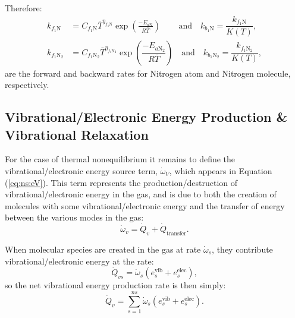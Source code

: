 \documentclass[10pt]{article}
\begin{document}
Therefore:
\begin{equation}
 \begin{split}
\label{eq:forward_rates1}
k_{f_1 \text{N}} &= C_{f_1 \text{N}} \bar{T}^{\eta_{f_1 \text{N}}} \exp\left(\frac{-E_{a\text{N}}}{R \bar{T}}\right) \qquad \,\mbox{and}\quad k_{b_1 \text{N}} = \dfrac{k_{f_1 \text{N}}}{K(T)},\\
%
k_{f_1 \text{N}_2} &= C_{f_1 \text{N}_2} \bar{T}^{\eta_{f_1 \text{N}_2}} \exp\left(\dfrac{-E_{a\text{N}_2}}{R \bar{T}}\right) \quad \mbox{and}\quad k_{b_1 \text{N}_2} = \dfrac{k_{f_1 \text{N}_2}}{K(T)},
%
 \end{split}
\end{equation}
are the forward and backward rates for Nitrogen atom and Nitrogen molecule, respectively.


\subsection{Vibrational/Electronic Energy Production \& Vibrational Relaxation}\label{sec:omega_v}

For the case of thermal nonequilibrium it remains to define the vibrational/electronic energy source term, $\dot{\omega}_V$, which appears in Equation (\ref{eq:ns:eV}).  This term represents the production/destruction of vibrational/electronic energy in the gas, and is due to both the creation of molecules with some vibrational/electronic energy and the transfer of energy between the various modes in the gas:
\begin{equation}
  \dot{\omega}_v = \dot{Q}_{v} + \dot{Q}_{\text{transfer}}.
\end{equation}

When molecular species are created in the gas at rate $\dot{\omega}_s$, they contribute vibrational/electronic energy at the rate: 
\begin{equation*}
  \dot{Q}_{vs}=\dot{\omega}_s\left(e^{\text{vib}}_{s} + e^{\text{elec}}_{s}\right),
\end{equation*}
so the net vibrational energy production rate is then simply:
\begin{equation}
  \label{eq:vibrational_energy_production}
  \dot{Q}_{v} = \sum_{s=1}^{ns} \dot{\omega}_s\left(e^{\text{vib}}_{s} + e^{\text{elec}}_{s}\right).
\end{equation}
\end{document}
